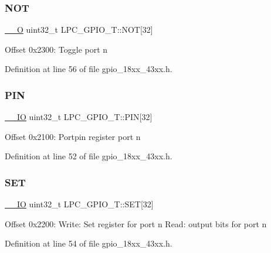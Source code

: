 \subsubsection{\texorpdfstring{N\+OT}{NOT}}
{\footnotesize\ttfamily \hyperlink{core__sc300_8h_a7e25d9380f9ef903923964322e71f2f6}{\+\_\+\+\_\+O} uint32\+\_\+t L\+P\+C\+\_\+\+G\+P\+I\+O\+\_\+\+T\+::\+N\+OT\mbox{[}32\mbox{]}}

Offset 0x2300\+: Toggle port n 

Definition at line 56 of file gpio\+\_\+18xx\+\_\+43xx.\+h.

\mbox{\label{struct_l_p_c___g_p_i_o___t_ae8c4c17105e4a8180f4c8456c2db2219}} 
\subsubsection{\texorpdfstring{P\+IN}{PIN}}
{\footnotesize\ttfamily \hyperlink{core__sc300_8h_aec43007d9998a0a0e01faede4133d6be}{\+\_\+\+\_\+\+IO} uint32\+\_\+t L\+P\+C\+\_\+\+G\+P\+I\+O\+\_\+\+T\+::\+P\+IN\mbox{[}32\mbox{]}}

Offset 0x2100\+: Portpin register port n 

Definition at line 52 of file gpio\+\_\+18xx\+\_\+43xx.\+h.

\mbox{\label{struct_l_p_c___g_p_i_o___t_a6bc4f0b21dca8c53a121db33850bab29}} 
\subsubsection{\texorpdfstring{S\+ET}{SET}}
{\footnotesize\ttfamily \hyperlink{core__sc300_8h_aec43007d9998a0a0e01faede4133d6be}{\+\_\+\+\_\+\+IO} uint32\+\_\+t L\+P\+C\+\_\+\+G\+P\+I\+O\+\_\+\+T\+::\+S\+ET\mbox{[}32\mbox{]}}

Offset 0x2200\+: Write\+: Set register for port n Read\+: output bits for port n 

Definition at line 54 of file gpio\+\_\+18xx\+\_\+43xx.\+h.

\mbox{\label{struct_l_p_c___g_p_i_o___t_a66399e55373c51ac06bc5c6f896706b6}} 
